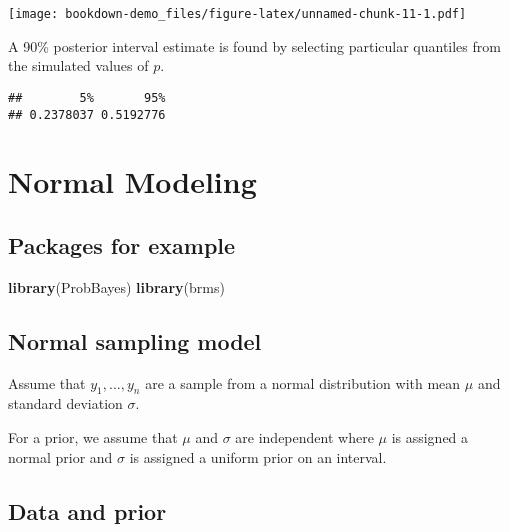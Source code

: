 \documentclass[
]{book}
\newenvironment{Shaded}{\begin{snugshade}}{\end{snugshade}}
\newcommand{\DecValTok}[1]{\textcolor[rgb]{0.00,0.00,0.81}{#1}}
\newcommand{\FloatTok}[1]{\textcolor[rgb]{0.00,0.00,0.81}{#1}}
\newcommand{\KeywordTok}[1]{\textcolor[rgb]{0.13,0.29,0.53}{\textbf{#1}}}
\newcommand{\NormalTok}[1]{#1}
\newcommand{\OperatorTok}[1]{\textcolor[rgb]{0.81,0.36,0.00}{\textbf{#1}}}
\begin{document}
\texttt{[image: bookdown-demo\_files/figure-latex/unnamed-chunk-11-1.pdf]}

A 90\% posterior interval estimate is found by selecting particular quantiles from the simulated values of \(p\).

\begin{Shaded}
\end{Shaded}

\begin{verbatim}
##        5%       95% 
## 0.2378037 0.5192776
\end{verbatim}

\hypertarget{normal-modeling}{%
\chapter{Normal Modeling}\label{normal-modeling}}

\hypertarget{packages-for-example}{%
\section{Packages for example}\label{packages-for-example}}

\begin{Shaded}
\begin{Highlighting}[]
\KeywordTok{library}\NormalTok{(ProbBayes)}
\KeywordTok{library}\NormalTok{(brms)}
\end{Highlighting}
\end{Shaded}

\hypertarget{normal-sampling-model}{%
\section{Normal sampling model}\label{normal-sampling-model}}

Assume that \(y_1, ..., y_n\) are a sample from a normal distribution with mean \(\mu\) and standard deviation \(\sigma\).

For a prior, we assume that \(\mu\) and \(\sigma\) are independent where \(\mu\) is assigned a normal prior and \(\sigma\) is assigned a uniform prior on an interval.

\hypertarget{data-and-prior}{%
\section{Data and prior}\label{data-and-prior}}
\end{document}
